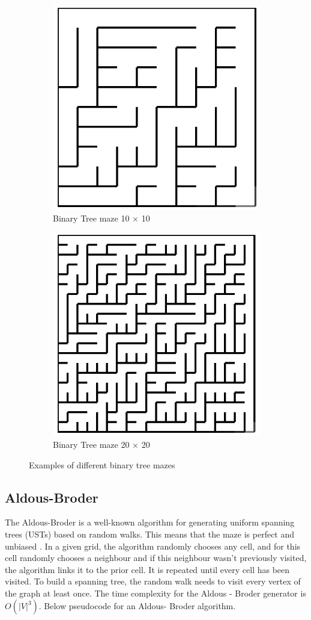 \begin{figure}[h]
	\centering
	\begin{subfigure}{.5\textwidth}
	  \centering
	  \includegraphics[width=.5\linewidth]{binary1010}
	  \caption{Binary Tree maze 10 $\times$ 10}
	  \label{fig:sub1}
	\end{subfigure}
	\begin{subfigure}{.5\textwidth}
	  \centering
	  \includegraphics[width=.5\linewidth]{binary2020}
	  \caption{Binary Tree maze 20 $\times$ 20}
	  \label{fig:sub2}
	\end{subfigure}
	\caption{Examples of different binary tree mazes}
	\label{fig:test}
	\end{figure}

\subsection{Aldous-Broder}

The Aldous-Broder is a well-known algorithm for generating uniform spanning trees (USTs) based on random walks. This means that the maze is perfect and unbiased \cite{INune}. In a given grid, the algorithm randomly chooses any cell, and for this cell randomly chooses a neighbour and if this neighbour wasn’t previously visited, the algorithm links it to the prior cell. It is repeated until every cell has been visited. To build a spanning tree, the random walk needs to visit every vertex of the graph at least once. The time complexity for the Aldous - Broder generator is $O(|V|^3)$. Below pseudocode for an Aldous- Broder algorithm.


